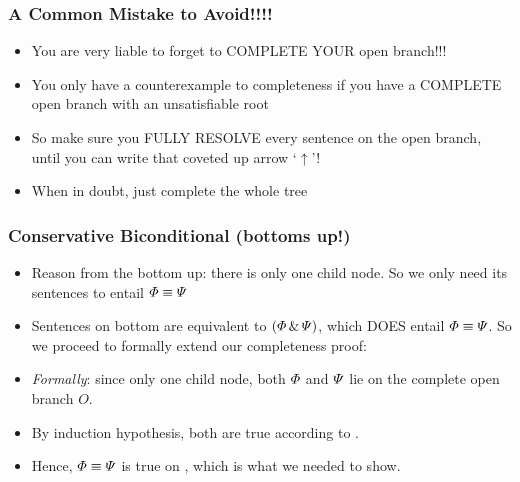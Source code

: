 \begin{frame}
\frametitle{A Common Mistake to Avoid!!!!}

\begin{itemize}[<+->]

\item You are very liable to forget to COMPLETE YOUR open branch!!!

\item You only have a counterexample to completeness if you have a COMPLETE open branch with an unsatisfiable root

\item So make sure you FULLY RESOLVE every sentence on the open branch, until you can write that coveted up arrow `$\uparrow$'! 

\item When in doubt, just complete the whole tree 


\end{itemize}
\end{frame}


\begin{frame}
\frametitle{Conservative Biconditional (bottoms up!)}

\begin{itemize}[<+->]

\item Reason from the bottom up: there is only one child node. So we only need its sentences to entail $\varPhi{}\equiv\varPsi{}$

\item Sentences on bottom are equivalent to $(\varPhi{} \,\&\, \varPsi{})$, which DOES entail $\varPhi{}\equiv\varPsi{}$. So we proceed to formally extend our completeness proof: 

\bigskip 

\bi 

\item \emph{Formally}: since only one child node, both $\varPhi{}$ and $\varPsi{}$ lie on the complete open branch $O$. 

\item By induction hypothesis, both are true according to . 

\item Hence, $\varPhi{}\equiv\varPsi{}$ is true on , which is what we needed to show. 

\ei 


\end{itemize}
\end{frame}


